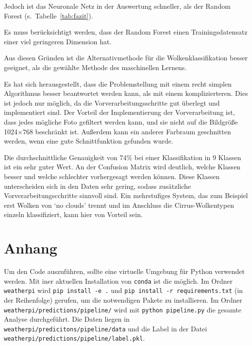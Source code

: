 Jedoch ist das Neuronale Netz in der Auswertung schneller, als der
Random Forest (s.~Tabelle~\ref{tab:fazit}).

Es muss berücksichtigt werden, dass der Random Forest einen
Trainingsdatensatz einer viel geringeren Dimension hat.

Aus diesen Gründen ist die Alternativmethode für die
Wolkenklassifikation besser geeignet, als die gewählte Methode des
maschinellen Lernens.

Es hat sich herausgestellt, dass die Problemstellung mit einem recht
simplen Algorithmus besser beantwortet werden kann, als mit einem
komplizierteren. Dies ist jedoch nur möglich, da die
Vorverarbeitungsschritte gut überlegt und implementiert sind. Der
Vorteil der Implementierung der Vorverarbeitung ist, dass jedes mögliche
Foto gefiltert werden kann, und sie nicht auf die Bildgröße 1024$\times$768
beschränkt ist. Außerdem kann ein anderer Farbraum geschnitten werden,
wenn eine gute Schnittfunktion gefunden wurde.

Die durchschnittliche Genauigkeit von 74\% bei einer Klassifikation in 9 Klassen
ist ein sehr guter Wert.
An der Confusion Matrix wird deutlich, welche Klassen besser und welche schlechter vorhergesagt
werden können.
Diese Klassen unterscheiden sich in den Daten sehr gering,
sodass zusätzliche Vorverarbeitungscchritte sinnvoll sind.
Ein mehrstufiges System,
das zum Beispiel erst Wolken von `no clouds' trennt
und im Anschluss die Cirrus-Wolkentypen einzeln klassifiziert,
kann hier von Vorteil sein.

\newpage

\hypertarget{anhang}{%
\section*{Anhang}\label{anhang}}

Um den Code auszuführen, sollte eine virtuelle Umgebung für Python
verwendet werden. Mit iner aktuellen Installation von \texttt{conda} ist
die möglich. Im Ordner \texttt{weatherpi} wird
\texttt{pip\ install\ -e\ .} und
\texttt{pip\ install\ -r\ requirements.txt} (in der Reihenfolge)
gerufen, um die notwendigen Pakete zu installieren. Im Ordner
\texttt{weatherpi/predictions/pipeline/} wird mit
\texttt{python\ pipeline.py} die gesamte Analyse durchgeführt. Die Daten
liegen in \texttt{weatherpi/predicitons/pipeline/data} und die Label in
der Datei \linebreak\texttt{weatherpi/predictions/pipeline/label.pkl}.

